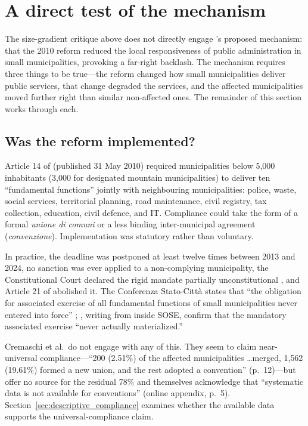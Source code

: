 \documentclass[12pt,letterpaper]{article}
\begin{document}
\section{A direct test of the mechanism}
\label{sec:mechanism}

The size-gradient critique above does not directly engage \citet{cremaschi2024}'s proposed mechanism: that the 2010 reform reduced the local responsiveness of public administration in small municipalities, provoking a far-right backlash. The mechanism requires three things to be true---the reform changed how small municipalities deliver public services, that change degraded the services, and the affected municipalities moved further right than similar non-affected ones. The remainder of this section works through each.

\subsection{Was the reform implemented?}
\label{sec:was_reform_implemented}

Article 14 of \citet{dl782010} (published 31 May 2010) required municipalities below 5,000 inhabitants (3,000 for designated mountain municipalities) to deliver ten ``fundamental functions'' jointly with neighbouring municipalities: police, waste, social services, territorial planning, road maintenance, civil registry, tax collection, education, civil defence, and IT. Compliance could take the form of a formal \textit{unione di comuni} or a less binding inter-municipal agreement (\textit{convenzione}). Implementation was statutory rather than voluntary.

In practice, the deadline was postponed at least twelve times between 2013 and 2024, no sanction was ever applied to a non-complying municipality, the Constitutional Court declared the rigid mandate partially unconstitutional \citep{sentenza332019}, and Article 21 of \citet{dl2022024} abolished it. The Conferenza Stato-Citt\`a states that ``the obligation for associated exercise of all fundamental functions of small municipalities never entered into force'' \citep{conferenzastatocitta}; \citet{diielsi2022}, writing from inside SOSE, confirm that the mandatory associated exercise ``never actually materialized.''

Cremaschi et al.\ do not engage with any of this. They seem to claim near-universal compliance---``200 (2.51\%) of the affected municipalities \ldots merged, 1{,}562 (19.61\%) formed a new union, and the rest adopted a convention'' (p.~12)---but offer no source for the residual 78\% and themselves acknowledge that ``systematic data is not available for conventions'' (online appendix, p.~5). Section~\ref{sec:descriptive_compliance} examines whether the available data supports the universal-compliance claim.
\end{document}

